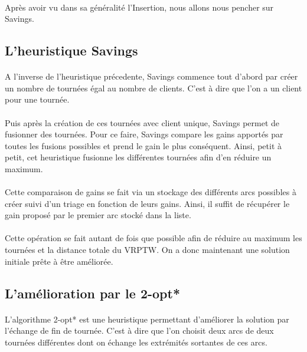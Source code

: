 \documentclass[12pt]{article}
\begin{document}
\paragraph{}
Après avoir vu dans sa généralité l'Insertion, nous allons nous pencher sur Savings.

\subsection{L'heuristique Savings}

\paragraph{}
A l'inverse de l'heuristique précedente, Savings commence tout d'abord par créer un nombre de tournées égal au nombre de clients. C'est à dire que l'on a un 
client pour une tournée.

\paragraph{}
Puis après la création de ces tournées avec client unique, Savings permet de fusionner des tournées. Pour ce faire, Savings compare les gains apportés par 
toutes les fusions possibles et prend le gain le plus conséquent. Ainsi, petit à petit, cet heuristique fusionne les différentes tournées afin d'en 
réduire un maximum.

\paragraph{}
Cette comparaison de gains se fait via un stockage des différents arcs possibles à créer suivi d'un triage en fonction de leurs gains. Ainsi, il suffit de récupérer 
le gain proposé par le premier arc stocké dans la liste.

\paragraph{}
Cette opération se fait autant de fois que possible afin de réduire au maximum les tournées et la distance totale du VRPTW. On a donc maintenant une solution 
initiale prête à être améliorée.

\subsection{L'amélioration par le 2-opt*}

\paragraph{}
L'algorithme 2-opt* est une heuristique permettant d'améliorer la solution par l'échange de fin de tournée. C'est à dire que l'on choisit deux arcs de deux 
tournées différentes dont on échange les extrémités sortantes de ces arcs.
\end{document}
